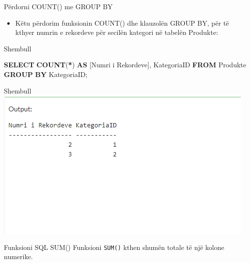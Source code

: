 \documentclass[
  ignorenonframetext,
]{beamer}
\newenvironment{Shaded}{\begin{snugshade}}{\end{snugshade}}
\newcommand{\FunctionTok}[1]{\textcolor[rgb]{0.13,0.29,0.53}{\textbf{#1}}}
\newcommand{\KeywordTok}[1]{\textcolor[rgb]{0.13,0.29,0.53}{\textbf{#1}}}
\newcommand{\NormalTok}[1]{#1}
\newcommand{\OperatorTok}[1]{\textcolor[rgb]{0.81,0.36,0.00}{\textbf{#1}}}
\providecommand{\tightlist}{%
  \setlength{\itemsep}{0pt}\setlength{\parskip}{0pt}}
\begin{document}
\begin{frame}{Përdorni COUNT() me GROUP BY}
\label{puxebrdorni-count-me-group-by}
\begin{itemize}
\tightlist
\item
  Këtu përdorim funksionin COUNT() dhe klauzolën GROUP BY, për të kthyer
  numrin e rekordeve për secilën kategori në tabelën Produkte:
\end{itemize}
\end{frame}

\begin{frame}[fragile]{Shembull}
\label{shembull-33}

\begin{Shaded}
\begin{Highlighting}[]
\KeywordTok{SELECT} \FunctionTok{COUNT}\NormalTok{(}\OperatorTok{*}\NormalTok{) }\KeywordTok{AS}\NormalTok{ [Numri i Rekordeve], KategoriaID}
\KeywordTok{FROM}\NormalTok{ Produkte}
\KeywordTok{GROUP} \KeywordTok{BY}\NormalTok{ KategoriaID;}
\end{Highlighting}
\end{Shaded}
\end{frame}

\begin{frame}{Shembull}
\label{shembull-34}
\includegraphics{./Figs/query49.png}
\end{frame}

\begin{frame}[fragile]{Funksioni SQL SUM()}
\label{funksioni-sql-sum}
Funksioni \texttt{SUM()} kthen shumën totale të një kolone numerike.
\end{frame}
\end{document}

